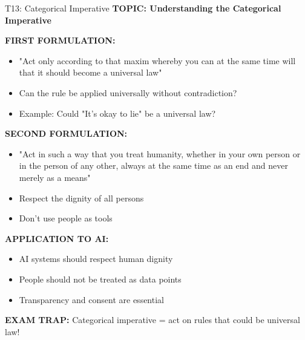 \documentclass[8pt]{beamer}
\begin{document}
	\begin{frame}{T13: Categorical Imperative}
		\fontsize{6.5}{7.5}\selectfont
		\textbf{TOPIC: Understanding the Categorical Imperative}
		
		\vspace{0.1cm}
		\textbf{FIRST FORMULATION:}
		\begin{itemize}
			\item "Act only according to that maxim whereby you can at the same time will that it should become a universal law"
			\item Can the rule be applied universally without contradiction?
			\item Example: Could "It's okay to lie" be a universal law?
		\end{itemize}
		
		\vspace{0.1cm}
		\textbf{SECOND FORMULATION:}
		\begin{itemize}
			\item "Act in such a way that you treat humanity, whether in your own person or in the person of any other, always at the same time as an end and never merely as a means"
			\item Respect the dignity of all persons
			\item Don't use people as tools
		\end{itemize}
		
		\vspace{0.1cm}
		\textbf{APPLICATION TO AI:}
		\begin{itemize}
			\item AI systems should respect human dignity
			\item People should not be treated as data points
			\item Transparency and consent are essential
		\end{itemize}
		
		\textcolor{myred}{\textbf{EXAM TRAP:}} Categorical imperative = \textcolor{myblue}{act on rules that could be universal law}!
	\end{frame}
	
\end{document}
